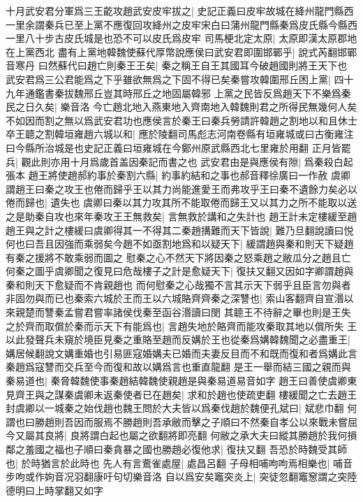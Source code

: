 十月武安君分軍爲三王齕攻趙武安皮牢拔之|{
	史記正義曰皮牢故城在絳州龍門縣西一里余謂秦兵已至上黨不應復回攻絳州之皮牢宋白曰蒲州龍門縣秦爲皮氏縣今縣西一里八十步古皮氏城是也恐不可以皮氏爲皮牢}
司馬梗北定太原|{
	太原即漢太原郡地在上黨西北}
盡有上黨地韓魏使蘇代厚幣說應侯曰武安君即圍邯鄲乎|{
	說式芮翻邯鄲音寒丹}
曰然蘇代曰趙亡則秦王王矣|{
	秦之稱王自王其國耳今破趙國則將王天下也}
武安君爲三公君能爲之下乎雖欲無爲之下固不得已矣秦嘗攻韓圍邢丘困上黨|{
	四十九年通鑑書秦拔魏邢丘豈其時邢丘之地固屬韓邪}
上黨之民皆反爲趙天下不樂爲秦民之日久矣|{
	樂音洛}
今亡趙北地入燕東地入齊南地入韓魏則君之所得民無幾何人矣不如因而割之無以爲武安君功也應侯言於秦王曰秦兵勞請許韓趙之割地以和且休士卒王聼之割韓垣雍趙六城以和|{
	應於陵翻司馬彪志河南卷縣有垣雍城或曰古衡雍注曰今縣所治城是也史記正義曰垣雍城在今鄭州原武縣西北七里雍於用翻}
正月皆罷兵|{
	觀此則亦用十月爲歲首盖因秦記而書之也}
武安君由是與應侯有隙|{
	爲秦殺白起張本}
趙王將使趙郝約事於秦割六縣|{
	約事約結和之事也郝音釋徐廣曰一作赦}
虞卿謂趙王曰秦之攻王也倦而歸乎王以其力尚能進愛王而弗攻乎王曰秦不遺餘力矣必以倦而歸也|{
	遺失也}
虞卿曰秦以其力攻其所不能取倦而歸王又以其力之所不能取以送之是助秦自攻也來年秦攻王王無救矣|{
	言無救於講和之失計也}
趙王計未定樓緩至趙趙王與之計之樓緩曰虞卿得其一不得其二秦趙搆難而天下皆說|{
	難乃旦翻說讀曰悦}
何也曰吾且因強而乘弱矣今趙不如亟割地爲和以疑天下|{
	緩謂趙與秦和則天下疑趙有秦之援將不敢乘弱而圖之}
慰秦之心不然天下將因秦之怒乘趙之敝瓜分之趙且亡何秦之圖乎虞卿聞之復見曰危哉樓子之計是愈疑天下|{
	復扶又翻又因如字卿謂趙與秦和則天下愈疑而不肯親趙也}
而何慰秦之心哉獨不言其示天下弱乎且臣言勿與者非固勿與而已也秦索六城於王而王以六城賂齊齊秦之深讐也|{
	索山客翻齊自宣湣以來親楚而讐秦孟嘗君嘗率諸侯伐秦至函谷湣讀曰閔}
其聼王不待辭之畢也則是王失之於齊而取償於秦而示天下有能爲也|{
	言趙失地於賂齊而能攻秦取其地以償所失}
王以此發聲兵未窺於境臣見秦之重賂至趙而反媾於王也從秦爲媾韓魏聞之必盡重王|{
	媾居候翻說文媾重婚也引易匪寇婚媾夫已婚而夫妻反目而不和既而復和者爲媾此言秦趙爲寇讐而交兵至今而復和故以媾爲言也重直龍翻}
是王一舉而結三國之親而與秦易道也|{
	秦脅韓魏使事秦趙結韓魏使親趙是與秦易道易音如字}
趙王曰善使虞卿東見齊王與之謀秦虞卿未返秦使者已在趙矣|{
	求和於趙也使疏吏翻}
樓緩聞之亡去趙王封虞卿以一城秦之始伐趙也魏王問於大夫皆以爲秦伐趙於魏便孔斌曰|{
	斌悲巾翻}
何謂也曰勝趙則吾因而服焉不勝趙則吾承敝而擊之子順曰不然秦自孝公以來戰未嘗屈今又屬其良將|{
	良將謂白起也屬之欲翻將即亮翻}
何敝之承大夫曰縱其勝趙於我何損鄰之羞國之福也子順曰秦貪暴之國也勝趙必復他求|{
	復扶又翻}
吾恐於時魏受其師也|{
	於時猶言於此時也}
先人有言鷰雀處屋|{
	處昌呂翻}
子母相哺呴呴焉相樂也|{
	哺音步呴或作姁音况羽翻康吁句切樂音洛}
自以爲安矣竈突炎上|{
	突徒忽翻竈䆫謂之突陸德明曰上時掌翻又如字}
